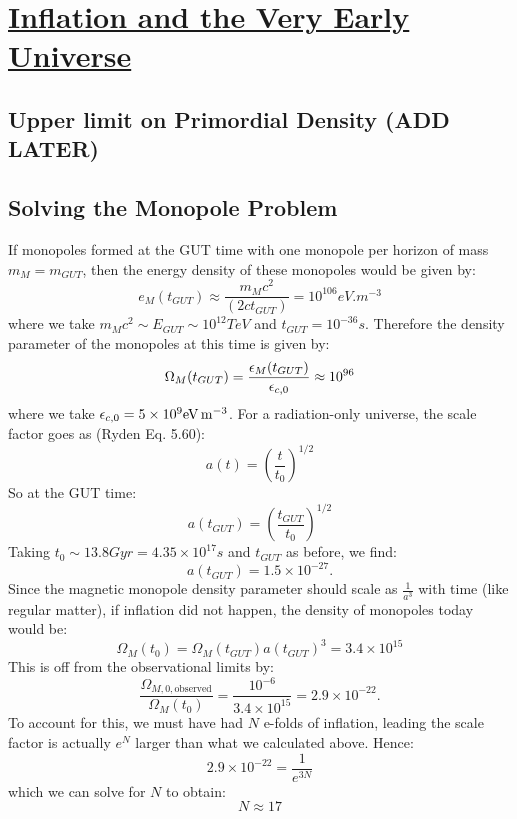 \section[Inflation and the Very Early Universe]{\hyperlink{toc}{Inflation and the Very Early Universe}}

\subsection{Upper limit on Primordial Density (ADD LATER)}

\subsection{Solving the Monopole Problem}
If monopoles formed at the GUT time with one monopole per horizon of mass $m_M = m_{GUT}$, then the energy density of these monopoles would be given by:
\begin{equation}
    e_M(t_{GUT}) \approx \frac{m_Mc^2}{(2ct_{GUT})} = 10^{106}\si{eV.m^{-3}}
\end{equation}
where we take $m_Mc^2 \sim E_{GUT} \sim 10^{12}\si{TeV}$ and $t_{GUT} = 10^{-36}\si{s}$. Therefore the density parameter of the monopoles at this time is given by:
\begin{equation}
    \Omega_M(t_{GUT}) = \frac{\e_{M}(t_{GUT})}{\e_{c, 0}} \approx 10^{96}
\end{equation}
where we take $\e_{c, 0} = 5 \times 10^9\si{eV.m^{-3}}$. For a radiation-only universe, the scale factor goes as (Ryden Eq. 5.60):
\begin{equation}
    a(t) = \left(\frac{t}{t_0}\right)^{1/2}
\end{equation}
So at the GUT time:
\begin{equation}
    a(t_{GUT}) = \left(\frac{t_{GUT}}{t_0}\right)^{1/2}
\end{equation}
Taking $t_0 \sim 13.8\si{Gyr} = 4.35 \times 10^{17}\si{s}$ and $t_{GUT}$ as before, we find:
\begin{equation}
    a(t_{GUT}) = 1.5 \times 10^{-27}.
\end{equation}
Since the magnetic monopole density parameter should scale as $\frac{1}{a^3}$ with time (like regular matter), if inflation did not happen, the density of monopoles today would be:
\begin{equation}
    \Omega_M(t_0) = \Omega_M(t_{GUT})a(t_{GUT})^3 = 3.4 \times 10^{15}
\end{equation}
This is off from the observational limits by:
\begin{equation}
    \frac{\Omega_{M, 0, \text{observed}}}{\Omega_M(t_0)} = \frac{10^{-6}}{3.4 \times 10^{15}} = 2.9 \times 10^{-22}.
\end{equation}
To account for this, we must have had $N$ e-folds of inflation, leading the scale factor is actually $e^{N}$ larger than what we calculated above. Hence:
\begin{equation}
    2.9 \times 10^{-22} = \frac{1}{e^{3N}}
\end{equation}
which we can solve for $N$ to obtain:
\begin{equation}
    \boxed{N \approx 17}
\end{equation}


